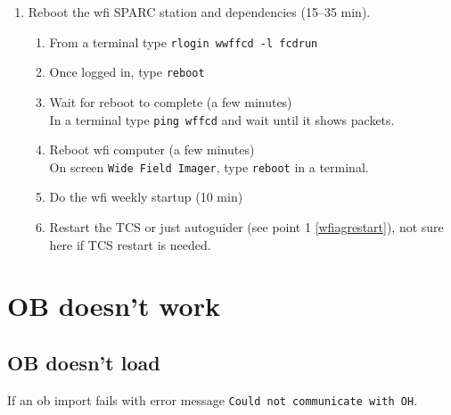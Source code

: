 \documentclass[11pt,fleqn,a4paper]{book}
\makeatletter
\def\menu#1#2{\texttt{#1}\ifx{}#2\else\@for\@x:=#2\do{$\rightarrow$\texttt{\@x}}\fi}
\def\wmenu#1#2{window menu \menu{#1}{#2}}
\makeatother
\begin{document}
\begin{enumerate}
\begin{enumerate}
       \item Perform a full restart the \gls{tcs} including \gls{vme} reboot ()
       \item Reactivate the connection between \gls{feros} and TCS
           \begin{itemize}
                \item On the \gls{feros} screen (), locate the \gls{feros} control panel ()
                \item Select \wmenu{Telescope}{ENABLE}
           \end{itemize}
    \end{enumerate}
    \item Reboot the \gls{wfi} SPARC station and dependencies (15--35 min).
    \begin{enumerate}
        \item From a terminal type \texttt{rlogin \gls{wwffcd} -l fcdrun}
        \item Once logged in, type \texttt{reboot}
        \item Wait for reboot to complete (a few minutes)\\
              In a terminal type \texttt{ping wffcd} and wait until it shows packets.
        \item Reboot \gls{wfi} computer (a few minutes)\\
              On screen \texttt{Wide Field Imager}, type \texttt{reboot} in a terminal.
        \item Do the \gls{wfi} weekly startup (10 min)
        \item Restart the TCS or just autoguider (see point 1 \ref{wfiagrestart}), not sure here if TCS restart is needed.
   
       \end{enumerate}
       
\end{enumerate}

\section{OB doesn't work}

\subsection{OB doesn't load}

If an \gls{ob} import fails with error message \texttt{Could not communicate with OH}.
\end{document}
